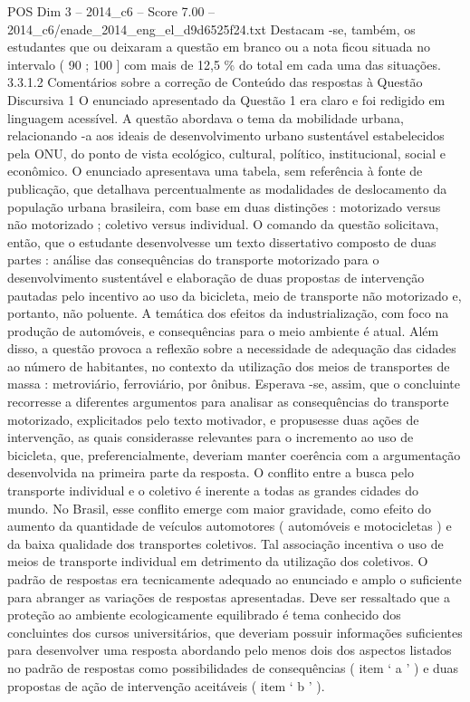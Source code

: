 \begin{textsample}{POS Dim 3 – 2014\_c6 – Score 7.00 – 2014\_c6/enade\_2014\_eng\_el\_d9d6525f24.txt}
Destacam -se, também, os estudantes que ou deixaram a questão em branco ou a nota ficou situada no intervalo ( 90 ; 100 ] com mais de 12,5 \% do total em cada uma das situações. 3.3.1.2 Comentários sobre a correção de Conteúdo das respostas à Questão Discursiva 1 O enunciado apresentado da Questão 1 era claro e foi redigido em linguagem acessível.
A questão abordava o tema da mobilidade urbana, relacionando -a aos ideais de desenvolvimento urbano sustentável estabelecidos pela ONU, do ponto de vista ecológico, cultural, político, institucional, social e econômico.
O enunciado apresentava uma tabela, sem referência à fonte de publicação, que detalhava percentualmente as modalidades de deslocamento da população urbana brasileira, com base em duas distinções : motorizado versus não motorizado ; coletivo versus individual.
O comando da questão solicitava, então, que o estudante desenvolvesse um texto dissertativo composto de duas partes : análise das consequências do transporte motorizado para o desenvolvimento sustentável e elaboração de duas propostas de intervenção pautadas pelo incentivo ao uso da bicicleta, meio de transporte não motorizado e, portanto, não poluente.
A temática dos efeitos da industrialização, com foco na produção de automóveis, e consequências para o meio ambiente é atual.
Além disso, a questão provoca a reflexão sobre a necessidade de adequação das cidades ao número de habitantes, no contexto da utilização dos meios de transportes de massa : metroviário, ferroviário, por ônibus.
Esperava -se, assim, que o concluinte recorresse a diferentes argumentos para analisar as consequências do transporte motorizado, explicitados pelo texto motivador, e propusesse duas ações de intervenção, as quais considerasse relevantes para o incremento ao uso de bicicleta, que, preferencialmente, deveriam manter coerência com a argumentação desenvolvida na primeira parte da resposta.
O conflito entre a busca pelo transporte individual e o coletivo é inerente a todas as grandes cidades do mundo.
No Brasil, esse conflito emerge com maior gravidade, como efeito do aumento da quantidade de veículos automotores ( automóveis e motocicletas ) e da baixa qualidade dos transportes coletivos.
Tal associação incentiva o uso de meios de transporte individual em detrimento da utilização dos coletivos.
O padrão de respostas era tecnicamente adequado ao enunciado e amplo o suficiente para abranger as variações de respostas apresentadas.
Deve ser ressaltado que a proteção ao ambiente ecologicamente equilibrado é tema conhecido dos concluintes dos cursos universitários, que deveriam possuir informações suficientes para desenvolver uma resposta abordando pelo menos dois dos aspectos listados no padrão de respostas como possibilidades de consequências ( item ‘ a ’ ) e duas propostas de ação de intervenção aceitáveis ( item ‘ b ’ ).

\end{textsample}
